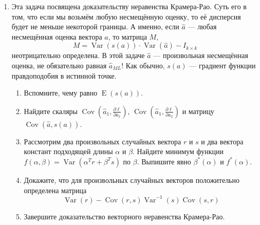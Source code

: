 \documentclass[12pt]{article} %
\theoremstyle{definition} %
\DeclareMathOperator{\Cov}{Cov}
\DeclareMathOperator{\Var}{Var}
\DeclareMathOperator{\E}{E}
\begin{document}
\begin{enumerate}
\begin{enumerate}
\end{enumerate}

  \item Эта задача посвящена доказательству неравенства Крамера-Рао. Суть его в том, что если мы возьмём любую несмещённую оценку, то её дисперсия будет не меньше некоторой границы. А именно, если $\hat a$ — любая несмещённая оценка вектора $a$, то матрица $M$,
  \[
  M = \Var(s(a))\cdot \Var(\hat a) - I_{k\times k}
  \]
  неотрицательно определена. В этой задаче $\hat a$ — произвольная несмещённая оценка, не обязательно равная $\hat a_{ML}$!
  Как обычно, $s(a)$ — градиент функции правдоподобия в истинной точке.

    \begin{enumerate}
      \item Вспомните, чему равно $\E(s(a))$.
      \item Найдите скаляры $\Cov\left(\hat a_1, \frac{\partial \ell}{\partial a_1}\right)$,
	$\Cov\left(\hat a_1, \frac{\partial \ell}{\partial a_2}\right)$
	и матрицу $\Cov\left(\hat a, s(a) \right)$.
      \item Рассмотрим два произвольных случайных вектора $r$ и $s$ и два вектора констант подходящей длины $\alpha$ и $\beta$.
	Найдите минимум функции $f(\alpha, \beta) = \Var(\alpha^T r + \beta^T s)$ по $\beta$.
	Выпишите явно $\beta^*(\alpha)$ и $f^*(\alpha)$.
      \item Докажите, что для произвольных случайных векторов положительно определена матрица
	\[
          \Var(r) - \Cov(r, s) \Var^{-1}(s)\Cov(s, r)
	\]
      \item Завершите доказательство векторного неравенства Крамера-Рао.
    \end{enumerate}




\end{enumerate}
\end{document}
